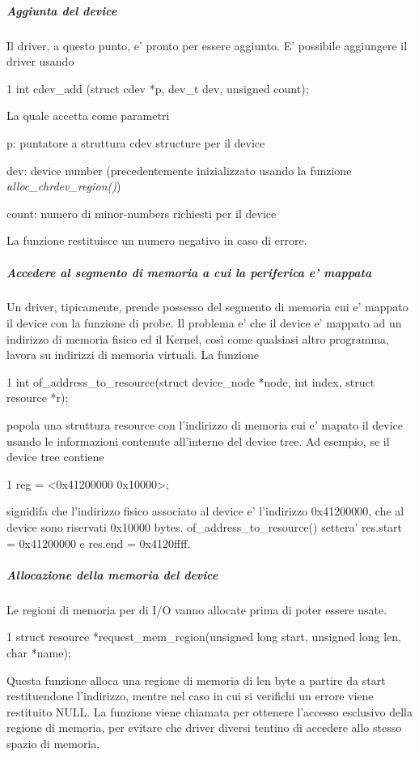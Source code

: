 \subparagraph*{Aggiunta del device}

Il driver, a questo punto, e' pronto per essere aggiunto. E' possibile aggiungere il driver usando 
\begin{DoxyCode}
1 int cdev\_add (struct cdev *p, dev\_t dev, unsigned count);
\end{DoxyCode}
 La quale accetta come parametri
\begin{DoxyItemize}
\item p\+: puntatore a struttura cdev structure per il device
\item dev\+: device number (precedentemente inizializzato usando la funzione {\itshape alloc\+\_\+chrdev\+\_\+region()})
\item count\+: numero di minor-\/numbers richiesti per il device
\end{DoxyItemize}

La funzione restituisce un numero negativo in caso di errore.

\subparagraph*{Accedere al segmento di memoria a cui la periferica e' mappata}

Un driver, tipicamente, prende possesso del segmento di memoria cui e' mappato il device con la funzione di probe. Il problema e' che il device e' mappato ad un indirizzo di memoria fisico ed il Kernel, così come qualsiasi altro programma, lavora su indirizzi di memoria virtuali. La funzione


\begin{DoxyCode}
1 int of\_address\_to\_resource(struct device\_node *node, int index, struct resource *r);
\end{DoxyCode}


popola una struttura resource con l'indirizzo di memoria cui e' mapato il device usando le informazioni contenute all'interno del device tree. Ad esempio, se il device tree contiene 
\begin{DoxyCode}
1 reg = <0x41200000 0x10000>;
\end{DoxyCode}
 signidifa che l'indirizzo fisico associato al device e' l'indirizzo 0x41200000, che al device sono riservati 0x10000 bytes. of\+\_\+address\+\_\+to\+\_\+resource() settera' res.\+start = 0x41200000 e res.\+end = 0x4120ffff.

\subparagraph*{Allocazione della memoria del device}

Le regioni di memoria per di I/\+O vanno allocate prima di poter essere usate. 
\begin{DoxyCode}
1 struct resource *request\_mem\_region(unsigned long start, unsigned long len, char *name);
\end{DoxyCode}
 Questa funzione alloca una regione di memoria di len byte a partire da start restituendone l'indirizzo, mentre nel caso in cui si verifichi un errore viene restituito N\+U\+L\+L. La funzione viene chiamata per ottenere l'accesso esclusivo della regione di memoria, per evitare che driver diversi tentino di accedere allo stesso spazio di memoria.

